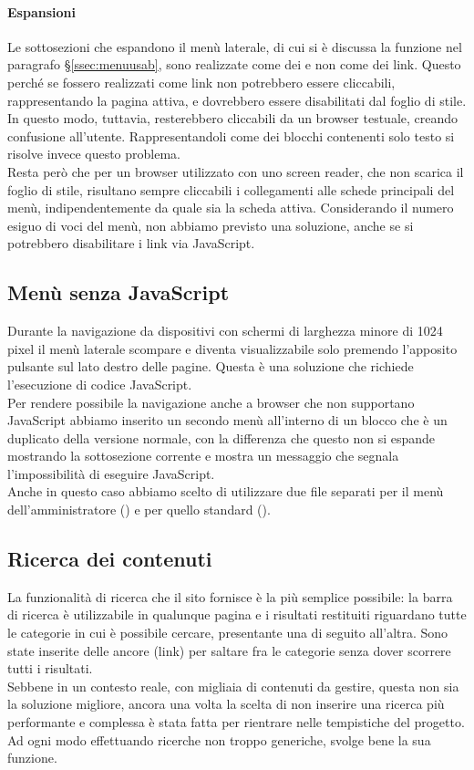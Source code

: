 \documentclass[12pt]{article}
\begin{document}
	\paragraph{Espansioni}
	Le sottosezioni che espandono il menù laterale, di cui si è discussa la funzione nel paragrafo §\ref{ssec:menuusab}, sono realizzate come dei  e non come dei link. Questo perché se fossero realizzati come link non potrebbero essere cliccabili, rappresentando la pagina attiva, e dovrebbero essere disabilitati dal foglio di stile. In questo modo, tuttavia, resterebbero cliccabili da un browser testuale, creando confusione all'utente. Rappresentandoli come dei blocchi contenenti solo testo si risolve invece questo problema.\\
	Resta però che per un browser utilizzato con uno screen reader, che non scarica il foglio di stile, risultano sempre cliccabili i collegamenti alle schede principali del menù, indipendentemente da quale sia la scheda attiva. Considerando il numero esiguo di voci del menù, non abbiamo previsto una soluzione, anche se si potrebbero disabilitare i link via JavaScript.
	
	\subsection{Menù senza JavaScript} \label{ssec:menusenzajs}
	Durante la navigazione da dispositivi con schermi di larghezza minore di 1024 pixel il menù laterale scompare e diventa visualizzabile solo premendo l'apposito pulsante sul lato destro delle pagine. Questa è una soluzione che richiede l'esecuzione di codice JavaScript.\\Per rendere possibile la navigazione anche a browser che non supportano JavaScript abbiamo inserito un secondo menù all'interno di un blocco  che è un duplicato della versione normale, con la differenza che questo non si espande mostrando la sottosezione corrente e mostra un messaggio che segnala l'impossibilità di eseguire JavaScript.\\
	Anche in questo caso abbiamo scelto di utilizzare due file separati per il menù dell'amministratore () e per quello standard (). 
	
	\subsection{Ricerca dei contenuti}
	La funzionalità di ricerca che il sito fornisce è la più semplice possibile: la barra di ricerca è utilizzabile in qualunque pagina e i risultati restituiti riguardano tutte le categorie in cui è possibile cercare, presentante una di seguito all'altra. Sono state inserite delle ancore (link) per saltare fra le categorie senza dover scorrere tutti i risultati.\\Sebbene in un contesto reale, con migliaia di contenuti da gestire, questa non sia la soluzione migliore, ancora una volta la scelta di non inserire una ricerca più performante e complessa è stata fatta per rientrare nelle tempistiche del progetto. Ad ogni modo effettuando ricerche non troppo generiche, svolge bene la sua funzione.
	
\end{document}
